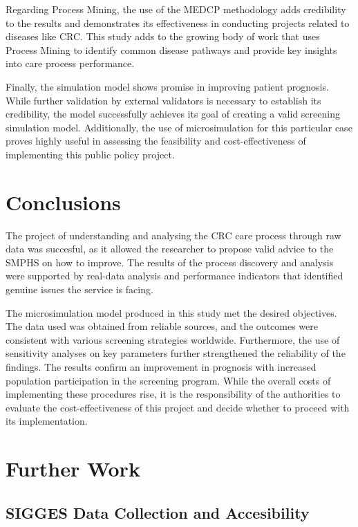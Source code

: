 Regarding Process Mining, the use of the MEDCP methodology adds credibility to the results and demonstrates its effectiveness in conducting projects related to diseases like CRC. This study adds to the growing body of work that uses Process Mining to identify common disease pathways and provide key insights into care process performance.

Finally, the simulation model shows promise in improving patient prognosis. While further validation by external validators is necessary to establish its credibility, the model successfully achieves its goal of creating a valid screening simulation model. Additionally, the use of microsimulation for this particular case proves highly useful in assessing the feasibility and cost-effectiveness of implementing this public policy project.

\section{Conclusions}

The project of understanding and analysing the CRC care process through raw data was succesful, as it allowed the researcher to propose valid advice to the SMPHS on how to improve. The results of the process discovery and analysis were supported by real-data analysis and performance indicators that identified genuine issues the service is facing.

The microsimulation model produced in this study met the desired objectives. The data used was obtained from reliable sources, and the outcomes were consistent with various screening strategies worldwide.  Furthermore, the use of sensitivity analyses on key parameters further strengthened the reliability of the findings. The results confirm an improvement in prognosis with increased population participation in the screening program. While the overall costs of implementing these procedures rise, it is the responsibility of the authorities to evaluate the cost-effectiveness of this project and decide whether to proceed with its implementation.

\section{Further Work}

\subsection*{SIGGES Data Collection and Accesibility}

